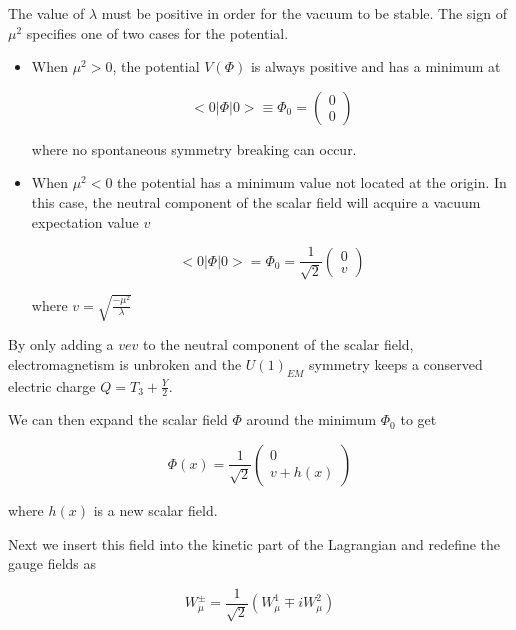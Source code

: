 	The value of $\lambda$ must be positive in order for the vacuum to be stable. The sign of $\mu^{2}$ specifies one of two cases for the potential.

	\begin{itemize}
			\item When $\mu^{2}>0$, the potential $V(\Phi)$ is always positive and has a minimum at

			\begin{equation}
			<0|\Phi|0>\equiv\Phi_{0} = \begin{pmatrix} 0 \\ 0 \end{pmatrix}
			\end{equation}

			where no spontaneous symmetry breaking can occur. 

			\item When $\mu^{2}<0$ the potential has a minimum value not located at the origin. In this case, the neutral component of the scalar field will acquire a vacuum expectation value $v$

			\begin{equation}
			<0|\Phi|0> = \Phi_{0} = \frac{1}{\sqrt{2}}\begin{pmatrix} 0 \\ v \end{pmatrix}
			\end{equation}

			where $v=\sqrt{\frac{-\mu^{2}}{\lambda}}$
	\end{itemize}

	
	By only adding a $vev$ to the neutral component of the scalar field, electromagnetism is unbroken and the $U(1)_{EM}$ symmetry keeps a conserved electric charge $Q=T_{3}+\frac{Y}{2}$.

	We can then expand the scalar field $\Phi$ around the minimum $\Phi_{0}$ to get 

		\begin{equation}
			\Phi(x) = \frac{1}{\sqrt{2}}\begin{pmatrix} 0 \\ v + h(x) \end{pmatrix}
		\end{equation}

	where $h(x)$ is a new scalar field.

	Next we insert this field into the kinetic part of the Lagrangian and redefine the gauge fields as 

		\begin{equation}
		W_{\mu}^{\pm} = \frac{1}{\sqrt{2}}(W_{\mu}^{1}\mp iW_{\mu}^{2})
		\end{equation}


